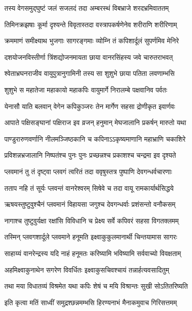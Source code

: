 \twolineshloka
{तस्य वेगसमुद्घुष्टं जलं सजलदं तदा}
{अम्बरस्थं विबभ्राजे शरदभ्रमिवाततम्} %

\twolineshloka
{तिमिनक्रझषाः कूर्मा दृश्यन्ते विवृतास्तदा}
{वस्त्रापकर्षणेनेव शरीराणि शरीरिणाम्} %

\twolineshloka
{क्रममाणं समीक्ष्याथ भुजगाः सागरङ्गमाः}
{व्योम्नि तं कपिशार्दूलं सुपर्णमिव मेनिरे} %

\twolineshloka
{दशयोजनविस्तीर्णा त्रिंशद्योजनमायता}
{छाया वानरसिंहस्य जवे चारुतराभवत्} %

\twolineshloka
{श्वेताभ्रघनराजीव वायुपुत्रानुगामिनी}
{तस्य सा शुशुभे छाया पतिता लवणाम्भसि} %

\twolineshloka
{शुशुभे स महातेजा महाकायो महाकपिः}
{वायुमार्गे निरालम्बे पक्षवानिव पर्वतः} %

\twolineshloka
{येनासौ याति बलवान् वेगेन कपिकुञ्जरः}
{तेन मार्गेण सहसा द्रोणीकृत इवार्णवः} %

\twolineshloka
{आपाते पक्षिसङ्घानां पक्षिराज इव व्रजन्}
{हनुमान् मेघजालानि प्रकर्षन् मारुतो यथा} %

\twolineshloka
{पाण्डुरारुणवर्णानि नीलमञ्जिष्ठकानि च}
{कपिनाऽऽकृष्यमाणानि महाभ्राणि चकाशिरे} %

\twolineshloka
{प्रविशन्नभ्रजालानि निष्पतंश्च पुनः पुनः}
{प्रच्छन्नश्च प्रकाशश्च चन्द्रमा इव दृश्यते} %

\twolineshloka
{प्लवमानं तु तं दृष्ट्वा प्लवगं त्वरितं तदा}
{ववृषुस्तत्र पुष्पाणि देवगन्धर्वचारणाः} %

\twolineshloka
{तताप नहि तं सूर्यः प्लवन्तं वानरेश्वरम्}
{सिषेवे च तदा वायू रामकार्यार्थसिद्धये} %

\twolineshloka
{ऋषयस्तुष्टुवुश्चैनं प्लवमानं विहायसा}
{जगुश्च देवगन्धर्वाः प्रशंसन्तो वनौकसम्} %

\twolineshloka
{नागाश्च तुष्टुवुर्यक्षा रक्षांसि विविधानि च}
{प्रेक्ष्य सर्वे कपिवरं सहसा विगतक्लमम्} %

\twolineshloka
{तस्मिन् प्लवगशार्दूले प्लवमाने हनूमति}
{इक्ष्वाकुकुलमानार्थी चिन्तयामास सागरः} %

\twolineshloka
{साहाय्यं वानरेन्द्रस्य यदि नाहं हनूमतः}
{करिष्यामि भविष्यामि सर्ववाच्यो विवक्षताम्} %

\twolineshloka
{अहमिक्ष्वाकुनाथेन सगरेण विवर्धितः}
{इक्ष्वाकुसचिवश्चायं तन्नार्हत्यवसादितुम्} %

\twolineshloka
{तथा मया विधातव्यं विश्रमेत यथा कपिः}
{शेषं च मयि विश्रान्तः सुखी सोऽतितरिष्यति} %

\twolineshloka
{इति कृत्वा मतिं साध्वीं समुद्रश्छन्नमम्भसि}
{हिरण्यनाभं मैनाकमुवाच गिरिसत्तमम्} %

